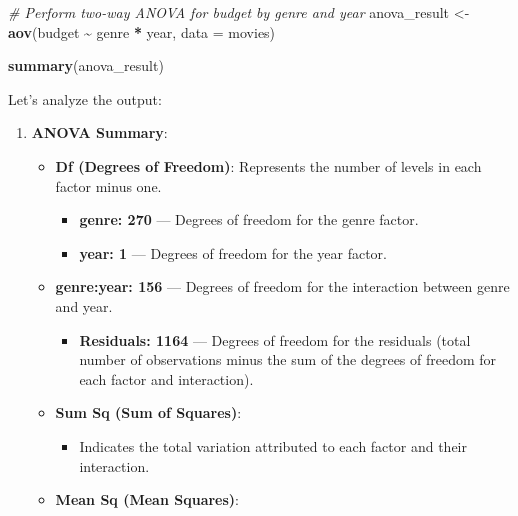 \documentclass[
]{book}
\newenvironment{Shaded}{\begin{snugshade}}{\end{snugshade}}
\newcommand{\AttributeTok}[1]{\textcolor[rgb]{0.13,0.29,0.53}{#1}}
\newcommand{\CommentTok}[1]{\textcolor[rgb]{0.56,0.35,0.01}{\textit{#1}}}
\newcommand{\FunctionTok}[1]{\textcolor[rgb]{0.13,0.29,0.53}{\textbf{#1}}}
\newcommand{\NormalTok}[1]{#1}
\newcommand{\OtherTok}[1]{\textcolor[rgb]{0.56,0.35,0.01}{#1}}
\newcommand{\SpecialCharTok}[1]{\textcolor[rgb]{0.81,0.36,0.00}{\textbf{#1}}}
\providecommand{\tightlist}{%
  \setlength{\itemsep}{0pt}\setlength{\parskip}{0pt}}
\begin{document}
\begin{Shaded}
\begin{Highlighting}[]
\CommentTok{\# Perform two{-}way ANOVA for budget by genre and year}
\NormalTok{anova\_result }\OtherTok{\textless{}{-}} \FunctionTok{aov}\NormalTok{(budget }\SpecialCharTok{\textasciitilde{}}\NormalTok{ genre }\SpecialCharTok{*}\NormalTok{ year, }\AttributeTok{data =}\NormalTok{ movies)}

\FunctionTok{summary}\NormalTok{(anova\_result)}
\end{Highlighting}
\end{Shaded}

Let's analyze the output:

\begin{enumerate}
\def\labelenumi{\arabic{enumi}.}
\tightlist
\item
  \textbf{ANOVA Summary}:

  \begin{itemize}
  \tightlist
  \item
    \textbf{Df (Degrees of Freedom)}: Represents the number of levels in each factor minus one.

    \begin{itemize}
    \tightlist
    \item
      \textbf{genre: 270} --- Degrees of freedom for the genre factor.
    \item
      \textbf{year: 1} --- Degrees of freedom for the year factor.
    \end{itemize}
  \item
    \textbf{genre:year: 156} --- Degrees of freedom for the interaction between genre and year.

    \begin{itemize}
    \tightlist
    \item
      \textbf{Residuals: 1164} --- Degrees of freedom for the residuals (total number of observations minus the sum of the degrees of freedom for each factor and interaction).
    \end{itemize}
  \item
    \textbf{Sum Sq (Sum of Squares)}:

    \begin{itemize}
    \tightlist
    \item
      Indicates the total variation attributed to each factor and their interaction.
    \end{itemize}
  \item
    \textbf{Mean Sq (Mean Squares)}:


\end{itemize}
\end{enumerate}
\end{document}
